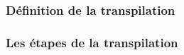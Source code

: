 \begin{frame}

    \frametitle{Définition de la transpilation\esp}
    
\end{frame}


\begin{frame}


    \frametitle{Les étapes de la transpilation \esp}

   
\end{frame}

